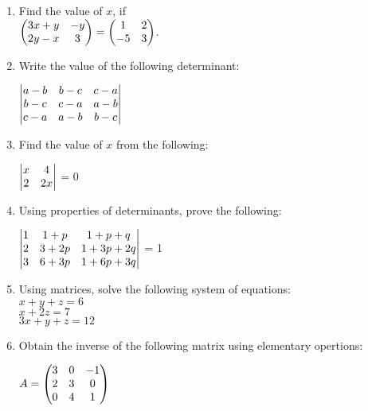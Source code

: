 \documentclass{article}
\begin{document}
\begin{enumerate}
	\item Find the value of $x$, if \\
		$\begin{pmatrix}3x+y & -y\\ 2y-x &3\end{pmatrix} = \begin{pmatrix}1 & 2\\ -5 & 3\end{pmatrix}$.
	\item Write the value of the following determinant:\\
		\centerline{$\begin{vmatrix}a-b & b-c & c-a\\ b-c & c-a & a-b\\ c-a & a-b & b-c\end{vmatrix}$}
	\item Find the value of $x$ from the following:\\
		\centerline{$\begin{vmatrix}x & 4\\2 & 2x\end{vmatrix}$ = 0}
	\item Using properties of determinants, prove the following:\\
		\centerline{$\begin{vmatrix}1 & 1+p & 1+p+q\\2 & 3+2p & 1+3p+2q\\3 & 6+3p & 1+6p+3q\end{vmatrix}$ = 1}
	\item Using matrices, solve the following system of equations:\\
		$x+y+z = 6$\\
		$x+2z = 7$\\
		$3x+y+z = 12$
	\item Obtain the inverse of the following matrix using elementary opertions:\\
		\centerline{$A = \begin{pmatrix}3 & 0 & -1\\2 & 3 & 0\\0 & 4 & 1\end{pmatrix}$}
\end{enumerate}
\end{document}
